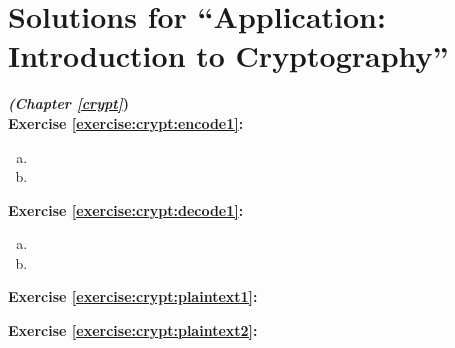 
\section{Solutions for ``Application: Introduction to Cryptography''}
\noindent\textbf{\textit{ (Chapter \ref{crypt}})}\bigskip
\\
\noindent\textbf{Exercise \ref{exercise:crypt:encode1}:}
\begin{enumerate}[(a)]
\item
\item
\end{enumerate}

\noindent\textbf{Exercise \ref{exercise:crypt:decode1}:}
\begin{enumerate}[(a)]
\item
\item
\end{enumerate}



\noindent\textbf{Exercise \ref{exercise:crypt:plaintext1}:}  
%
%

\noindent\textbf{Exercise \ref{exercise:crypt:plaintext2}:}
%
%


